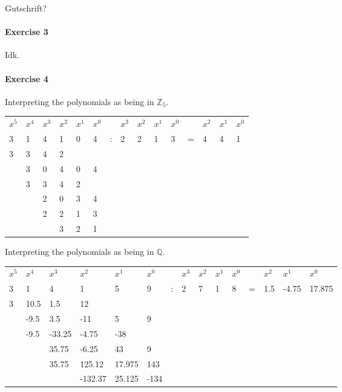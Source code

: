 \documentclass{article}
\begin{document}
Gutschrift?

\pagebreak
\paragraph{Exercise 3}

Idk.

\pagebreak
\paragraph{Exercise 4}

Interpreting the polynomials as being in $\mathbb{Z}_5$.
\begin{center}
    \begin{tabular}{l l l l l l l l l l l l l l l}
        $x^5$&$x^4$&$x^3$&$x^2$&$x^1$&$x^0$&&$x^3$&$x^2$&$x^1$&$x^0$&&$x^2$&$x^1$&$x^0$ \\
        3&1&4&1&0&4 &:& 2&2&1&3 &=& 4&4&1 \\
        3&3&4&2&&&&&&&&&&& \\\cmidrule{1-4}
        &3&0&4&0&4&&&&&&&&& \\
        &3&3&4&2&&&&&&&&&& \\\cmidrule{2-5}
        &&2&0&3&4&&&&&&& \\
        &&2&2&1&3&&&&&&& \\\cmidrule{3-6}
        &&&3&2&1&&&&&&& \\
    \end{tabular}
\end{center}

Interpreting the polynomials as being in $\mathbb{Q}$.

\begin{center}
    \begin{tabular}{l l l l l l l l l l l l l l l}
        $x^5$&$x^4$&$x^3$&$x^2$&$x^1$&$x^0$&&$x^3$&$x^2$&$x^1$&$x^0$&&$x^2$&$x^1$&$x^0$ \\
        3&1&4&1&5&9 &:& 2&7&1&8 &=& 1.5&-4.75&17.875 \\
        3&10.5&1.5&12&&&&&&&&&&& \\\cmidrule{1-4}
        &-9.5&3.5&-11&5&9&&&&&&&&& \\
        &-9.5&-33.25&-4.75&-38&&&&&&&&&& \\\cmidrule{2-5}
        &&35.75&-6.25&43&9&&&&&&& \\
        &&35.75&125.12&17.975&143&&&&&&& \\\cmidrule{3-6}
        &&&-132.37&25.125&-134&&&&&&& \\
    \end{tabular}
\end{center}
\end{document}
